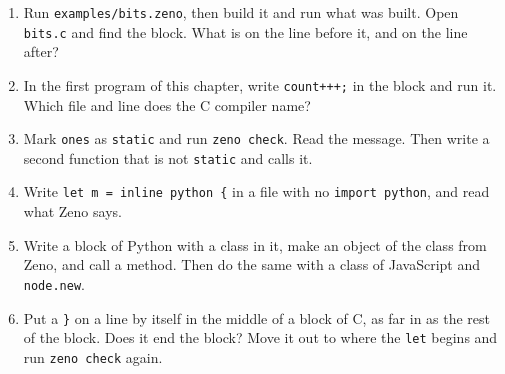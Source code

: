 \begin{enumerate}
\item Run \verb|examples/bits.zeno|, then build it and run what was
  built. Open \verb|bits.c| and find the block. What is on the line
  before it, and on the line after?
\item In the first program of this chapter, write \verb|count+++;| in
  the block and run it. Which file and line does the C compiler name?
\item Mark \verb|ones| as \verb|static| and run \verb|zeno check|.
  Read the message. Then write a second function that is not
  \verb|static| and calls it.
\item Write \verb|let m = inline python {| in a file with no
  \verb|import python|, and read what Zeno says.
\item Write a block of Python with a class in it, make an object of
  the class from Zeno, and call a method. Then do the same with a
  class of JavaScript and \verb|node.new|.
\item Put a \verb|}| on a line by itself in the middle of a block of
  C, as far in as the rest of the block. Does it end the block? Move
  it out to where the \verb|let| begins and run \verb|zeno check|
  again.
\end{enumerate}
